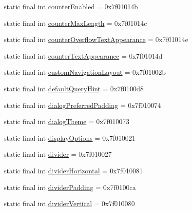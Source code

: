 \begin{CompactItemize}
static final int \hyperlink{classandroid_1_1support_1_1graphics_1_1drawable_1_1animated_1_1_r_1_1attr_d76095e13082479039b377903273e310}{counterEnabled} = 0x7f01014b
\item 
static final int \hyperlink{classandroid_1_1support_1_1graphics_1_1drawable_1_1animated_1_1_r_1_1attr_49371031a831f0a9d1182c734bb0e9c8}{counterMaxLength} = 0x7f01014c
\item 
static final int \hyperlink{classandroid_1_1support_1_1graphics_1_1drawable_1_1animated_1_1_r_1_1attr_4ee2bbdc55fb62cd8d3ca134916a7f22}{counterOverflowTextAppearance} = 0x7f01014e
\item 
static final int \hyperlink{classandroid_1_1support_1_1graphics_1_1drawable_1_1animated_1_1_r_1_1attr_0c8281038ece5a167e817b2f3162f549}{counterTextAppearance} = 0x7f01014d
\item 
static final int \hyperlink{classandroid_1_1support_1_1graphics_1_1drawable_1_1animated_1_1_r_1_1attr_694c2a9f6cd7fab4a0b85512426a453f}{customNavigationLayout} = 0x7f01002b
\item 
static final int \hyperlink{classandroid_1_1support_1_1graphics_1_1drawable_1_1animated_1_1_r_1_1attr_ce863b1d025d537ef86ec2268260cb3a}{defaultQueryHint} = 0x7f0100d8
\item 
static final int \hyperlink{classandroid_1_1support_1_1graphics_1_1drawable_1_1animated_1_1_r_1_1attr_5893f9b48cd41c4dadf963810260f8d7}{dialogPreferredPadding} = 0x7f010074
\item 
static final int \hyperlink{classandroid_1_1support_1_1graphics_1_1drawable_1_1animated_1_1_r_1_1attr_75b59b0b7f75587a1249fa9a1332bf79}{dialogTheme} = 0x7f010073
\item 
static final int \hyperlink{classandroid_1_1support_1_1graphics_1_1drawable_1_1animated_1_1_r_1_1attr_51dabf0e05f64aa277ecb4ab2289840d}{displayOptions} = 0x7f010021
\item 
static final int \hyperlink{classandroid_1_1support_1_1graphics_1_1drawable_1_1animated_1_1_r_1_1attr_27f74756e16d4eb788afddff585b6283}{divider} = 0x7f010027
\item 
static final int \hyperlink{classandroid_1_1support_1_1graphics_1_1drawable_1_1animated_1_1_r_1_1attr_6ae12989319b5ab31a96a31b005ee7fe}{dividerHorizontal} = 0x7f010081
\item 
static final int \hyperlink{classandroid_1_1support_1_1graphics_1_1drawable_1_1animated_1_1_r_1_1attr_b8fddf27c9622646132caa52094cdb87}{dividerPadding} = 0x7f0100ca
\item 
static final int \hyperlink{classandroid_1_1support_1_1graphics_1_1drawable_1_1animated_1_1_r_1_1attr_b95f123f2624010a2af40db393c872a0}{dividerVertical} = 0x7f010080

\end{CompactItemize}
